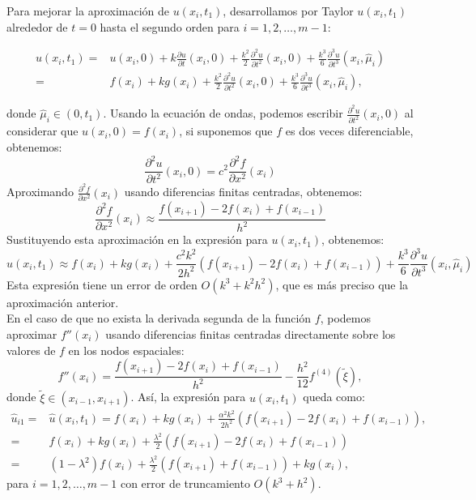 \documentclass{replab}
\begin{document}
Para mejorar la aproximación de $u(x_i,t_1)$, desarrollamos por Taylor $u(x_i,t_1)$ alrededor de $t=0$ hasta el segundo orden para $i=1,2,\ldots,m-1$:

\begin{align*}
u(x_i,t_1)=& u(x_i,0)+k\frac{\partial u}{\partial t}(x_i,0)+\frac{k^2}{2}\frac{\partial^2 u}{\partial t^2}(x_i,0)+\frac{k^3}{6}\frac{\partial^3 u}{\partial t^3}(x_i,\hat{\mu}_i)\\ 
= & f(x_i)+k g(x_i)+\frac{k^2}{2}\frac{\partial^2 u}{\partial t^2}(x_i,0)+\frac{k^3}{6}\frac{\partial^3 u}{\partial t^3}(x_i,\hat{\mu}_i),
\end{align*}

donde $\hat{\mu}_i \in (0,t_1)$. Usando la ecuación de ondas, podemos escribir $\frac{\partial^2 u}{\partial t^2}(x_i,0)$ al considerar que $u(x_i,0)=f(x_i)$, si suponemos que $f$ es dos veces diferenciable, obtenemos:
$$ \frac{\partial^2 u}{\partial t^2}(x_i,0) = c^2 \frac{\partial^2 f}{\partial x^2}(x_i) $$
Aproximando $\frac{\partial^2 f}{\partial x^2}(x_i)$ usando diferencias finitas centradas, obtenemos:
$$ \frac{\partial^2 f}{\partial x^2}(x_i) \approx \frac{f(x_{i+1}) - 2f(x_i) + f(x_{i-1})}{h^2} $$
Sustituyendo esta aproximación en la expresión para $u(x_i,t_1)$, obtenemos:
$$ u(x_i,t_1) \approx f(x_i) + k g(x_i) + \frac{c^2 k^2}{2h^2} \left( f(x_{i+1}) - 2f(x_i) + f(x_{i-1}) \right) + \frac{k^3}{6} \frac{\partial^3 u}{\partial t^3}(x_i,\hat{\mu}_i) $$
Esta expresión tiene un error de orden $O(k^3 + k^2 h^2)$, que es más preciso que la aproximación anterior.\\

En el caso de que no exista la derivada segunda de la función $f$, podemos aproximar $f''(x_i)$ usando diferencias finitas centradas directamente sobre los valores de $f$ en los nodos espaciales:
\[f''(x_i)=\frac{f(x_{i+1})-2f(x_i)+f(x_{i-1})}{h^2}-\frac{h^2}{12}f^{(4)}(\tilde{\xi}),\]
donde $\tilde{\xi} \in (x_{i-1},x_{i+1})$. Así, la expresión para $u(x_i,t_1)$ queda como:
\begin{align*}
\hat{u}_{i1}= & \hat{u}(x_i,t_1)=f(x_i)+kg(x_i)+\frac{\alpha^2 k^2}{2h^2}(f(x_{i+1})-2f(x_i)+f(x_{i-1})),\\
= & f(x_i)+kg(x_i)+\frac{\lambda^2}{2}(f(x_{i+1})-2f(x_i)+f(x_{i-1}))\\
= & \left(1-\lambda^2\right)f(x_i)+\frac{\lambda^2}{2}(f(x_{i+1})+f(x_{i-1}))+kg(x_i),
\end{align*}
para $i=1,2,\ldots,m-1$ con error de truncamiento $O(k^3+h^2)$.\\








\printbibliography[heading=bibintoc]
\end{document}
